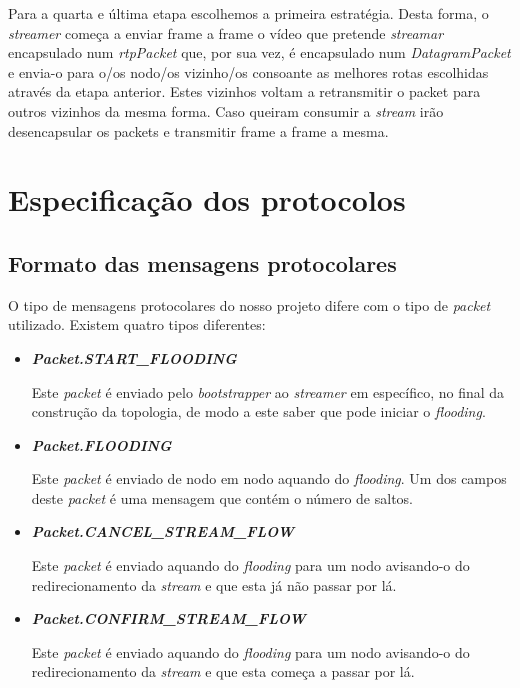 \documentclass[a4paper, 11pt]{article}
\begin{document}
Para a quarta e última etapa escolhemos a primeira estratégia. Desta forma, o \textit{streamer} começa a enviar frame a frame o vídeo que pretende \textit{streamar} encapsulado num \textit{rtpPacket} que, por sua vez, é encapsulado num \textit{DatagramPacket} e envia-o para o/os nodo/os vizinho/os consoante as melhores rotas escolhidas através da etapa anterior. Estes vizinhos voltam a retransmitir o packet para outros vizinhos da mesma forma. Caso queiram consumir a \textit{stream} irão desencapsular os packets e transmitir frame a frame a mesma.




\section{Especificação dos protocolos}

\subsection{Formato das mensagens protocolares}

O tipo de mensagens protocolares do nosso projeto difere com o tipo de \textit{packet} utilizado. Existem quatro tipos diferentes:

\begin{itemize}
    \item \textbf{\textit{Packet.START\_FLOODING}}
    
    Este \textit{packet} é enviado pelo \textit{bootstrapper} ao \textit{streamer} em específico, no final da construção da topologia, de modo a este saber que pode iniciar o \textit{flooding}.
    
    \item \textbf{\textit{Packet.FLOODING}}
    
    Este \textit{packet} é enviado de nodo em nodo aquando do \textit{flooding}. Um dos campos deste \textit{packet} é uma mensagem que contém o número de saltos.
    
    \item \textbf{\textit{Packet.CANCEL\_STREAM\_FLOW}}
    
    Este \textit{packet} é enviado aquando do \textit{flooding} para um nodo avisando-o do redirecionamento da \textit{stream} e que esta já não passar por lá.
    
    \item \textbf{\textit{Packet.CONFIRM\_STREAM\_FLOW}}
    
    Este \textit{packet} é enviado aquando do \textit{flooding} para um nodo avisando-o do redirecionamento da \textit{stream} e que esta começa a passar por lá. 
    
\end{itemize}
\end{document}
